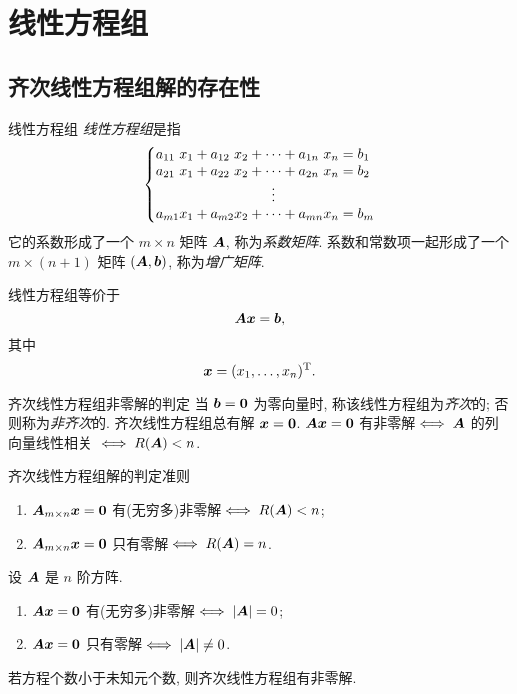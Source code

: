 \section{线性方程组}

\subsection{齐次线性方程组解的存在性}

\begin{frame}{线性方程组}
	\onslide<+->
	\emph{线性方程组}是指
	\[\laeq[lclcclcl]{
		a_{11}&x_1+{}&a_{12}&x_2&{}+\cdots+{}&a_{1n}&x_n={}&b_1\\
		a_{21}&x_1+{}&a_{22}&x_2&{}+\cdots+{}&a_{2n}&x_n={}&b_2\\
		&&&&\vdots&&&\\
		a_{m1}&x_1+{}&a_{m2}&x_2&{}+\cdots+{}&a_{mn}&x_n={}&b_m
	}\]
	\onslide<+->
	它的系数形成了一个 $m\times n$ 矩阵 ${\boldsymbol{A}}$, 称为\emph{系数矩阵}.
	\onslide<+->
	系数和常数项一起形成了一个 $m\times(n+1)$ 矩阵 $({\boldsymbol{A}},{\boldsymbol{b}})$, 称为\emph{增广矩阵}.

	\onslide<+->
	线性方程组等价于
	\[{\boldsymbol{A}}{\boldsymbol{x}}={\boldsymbol{b}},\]
	其中
	\[{\boldsymbol{x}}=(x_1,\dots,x_n)^{\mathrm{T}}.\]
\end{frame}


\begin{frame}{齐次线性方程组非零解的判定}
	\onslide<+->
	当 ${\boldsymbol{b}}={\bf0}$ 为零向量时, 称该线性方程组为\emph{齐次}的; 否则称为\emph{非齐次}的.
	\onslide<+->
	齐次线性方程组总有解 ${\boldsymbol{x}}={\bf0}$.
	\onslide<+->
	${\boldsymbol{A}}{\boldsymbol{x}}={\bf0}$ 有非零解$\iff{\boldsymbol{A}}$ 的列向量线性相关
	\onslide<+->
	$\iff R({\boldsymbol{A}})<n$.
	\onslide<+->
	\begin{second}{齐次线性方程组解的判定准则}
		\begin{enumerate}
			\item ${\boldsymbol{A}}_{m\times n}{\boldsymbol{x}}={\bf0}$ 有(无穷多)非零解$\iff R({\boldsymbol{A}})<n$;
			\item ${\boldsymbol{A}}_{m\times n}{\boldsymbol{x}}={\bf0}$ 只有零解$\iff R({\boldsymbol{A}})=n$.
		\end{enumerate}
	\end{second}
	\onslide<+->
	\begin{corollary}
		设 ${\boldsymbol{A}}$ 是 $n$ 阶方阵.
		\begin{enumerate}
			\item ${\boldsymbol{A}}{\boldsymbol{x}}={\bf0}$ 有(无穷多)非零解$\iff |{\boldsymbol{A}}|=0$;
			\item ${\boldsymbol{A}}{\boldsymbol{x}}={\bf0}$ 只有零解$\iff |{\boldsymbol{A}}|\neq0$.
		\end{enumerate}
	\end{corollary}
	\onslide<+->
	\begin{corollary}
		若方程个数小于未知元个数, 则齐次线性方程组有非零解.
	\end{corollary}
\end{frame}


